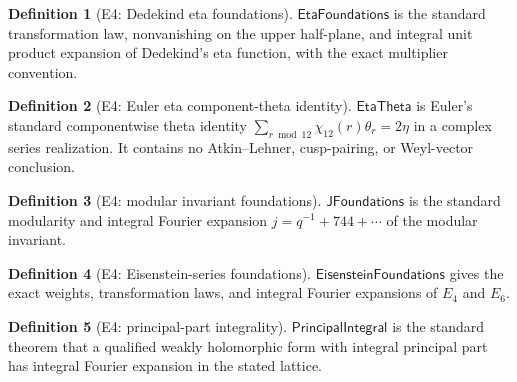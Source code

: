 \documentclass[11pt,a4paper]{article}
\numberwithin{equation}{section}
\theoremstyle{plain}\newtheorem{theorem}{Theorem}[section]\newaliascnt{proposition}{theorem}\newtheorem{proposition}[proposition]{Proposition}\aliascntresetthe{proposition}\newaliascnt{lemma}{theorem}\newtheorem{lemma}[lemma]{Lemma}\aliascntresetthe{lemma}
\theoremstyle{definition}\newaliascnt{definition}{theorem}\newtheorem{definition}[definition]{Definition}\aliascntresetthe{definition}\newaliascnt{notation}{theorem}\newtheorem{notation}[notation]{Notation}\aliascntresetthe{notation}
\providecommand{\lean}[1]{}\providecommand{\leanok}{}
\begin{document}
\begin{definition}[E4: Dedekind eta foundations]\label{def_ext_modular_forms}\lean{SptCM.RolenLiterature.DedekindEtaFoundations}\leanok
$\mathsf{EtaFoundations}$ is the standard transformation law, nonvanishing on the upper half-plane, and integral unit product expansion of Dedekind's eta function, with the exact multiplier convention.
\end{definition}
\begin{definition}[E4: Euler eta component-theta identity]\label{def_ext_eta_component_theta}\lean{SptCM.Analytic.Repaired.EtaComponentThetaIdentity}\leanok
$\mathsf{EtaTheta}$ is Euler's standard componentwise theta identity
$\sum_{r\bmod 12}\chi_{12}(r)\theta_r=2\eta$ in a complex series
realization.  It contains no Atkin--Lehner, cusp-pairing, or Weyl-vector
conclusion.
\end{definition}
\begin{definition}[E4: modular invariant foundations]\label{def_ext_j_foundations}\lean{SptCM.RolenLiterature.ModularInvariantFoundations}\leanok
$\mathsf{JFoundations}$ is the standard modularity and integral Fourier expansion $j=q^{-1}+744+\cdots$ of the modular invariant.
\end{definition}
\begin{definition}[E4: Eisenstein-series foundations]\label{def_ext_eisenstein_foundations}\lean{SptCM.RolenLiterature.EisensteinFoundations}\leanok
$\mathsf{EisensteinFoundations}$ gives the exact weights, transformation laws, and integral Fourier expansions of $E_4$ and $E_6$.
\end{definition}
\begin{definition}[E4: principal-part integrality]\label{def_ext_principal_integrality}\lean{SptCM.RolenLiterature.PrincipalPartIntegrality}\leanok
$\mathsf{PrincipalIntegral}$ is the standard theorem that a qualified weakly holomorphic form with integral principal part has integral Fourier expansion in the stated lattice.
\end{definition}
\end{document}
